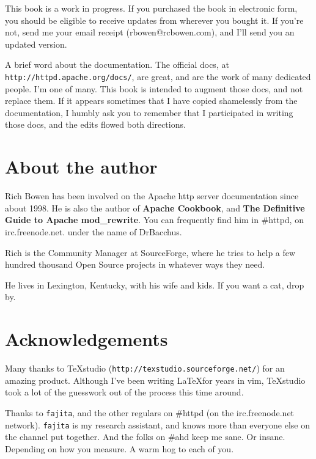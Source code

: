This book is a work in progress. If you purchased the book in electronic
form, you should be eligible to receive updates from wherever you bought
it. If you're not, send me your email receipt (rbowen@rcbowen.com), 
and I'll send you an updated version.

A brief word about the documentation. The official docs, at \verb~http://httpd.apache.org/docs/~, are great, and are the work of many dedicated people. I'm one of many. This book is intended to augment those docs, and not replace them. If it appears sometimes that I have copied shamelessly from the documentation, I humbly ask you to remember that I participated in writing those docs, and the edits flowed both directions.

\section{About the author}

Rich Bowen has been involved on the Apache http server documentation
since about 1998. He is also the author of \textbf{Apache Cookbook}, and \textbf{The
Definitive Guide to Apache mod\_rewrite}. You can frequently find him in
\#httpd, on irc.freenode.net. under the name of DrBacchus.

Rich is the Community Manager at SourceForge, where he tries to help a few
hundred thousand Open Source projects in whatever ways they need.

He lives in Lexington, Kentucky, with his wife and kids. If you want a cat, drop by.

\section{Acknowledgements}

Many thanks to TeXstudio (\verb~http://texstudio.sourceforge.net/~) for an amazing product. Although I've been writing \LaTeX  for years in vim, TeXstudio took a lot of the guesswork out of the process this time around.

Thanks to \verb~fajita~, and the other regulars on \#httpd (on the irc.freenode.net network). \verb~fajita~ is my research assistant, and knows more than everyone else on the channel put together. And the folks on \#ahd keep me sane. Or insane. Depending on how you measure. A warm hog to each of you.

